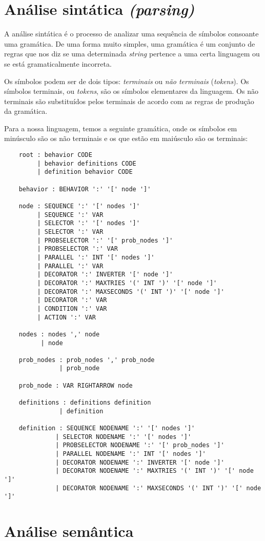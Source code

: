 \section{Análise sintática \textit{(parsing)}}
A análise sintática é o processo de analizar uma sequência de símbolos consoante uma gramática.
De uma forma muito simples, uma gramática é um conjunto de regras que nos diz se uma determinada \textit{string} pertence a uma certa linguagem ou se está gramaticalmente incorreta.

Os símbolos podem ser de dois tipos: \textit{terminais} ou \textit{não terminais} (\textit{tokens}).
Os símbolos terminais, ou \textit{tokens}, são os símbolos elementares da linguagem.
Os não terminais são substituídos pelos terminais de acordo com as regras de produção da gramática.

Para a nossa linguagem, temos a seguinte gramática, onde os símbolos em minúsculo são os não terminais e os que estão em maiúsculo são os terminais:

\begin{lstlisting}
    root : behavior CODE
         | behavior definitions CODE
         | definition behavior CODE

    behavior : BEHAVIOR ':' '[' node ']'

    node : SEQUENCE ':' '[' nodes ']'
         | SEQUENCE ':' VAR
         | SELECTOR ':' '[' nodes ']'
         | SELECTOR ':' VAR
         | PROBSELECTOR ':' '[' prob_nodes ']'
         | PROBSELECTOR ':' VAR
         | PARALLEL ':' INT '[' nodes ']'
         | PARALLEL ':' VAR
         | DECORATOR ':' INVERTER '[' node ']'
         | DECORATOR ':' MAXTRIES '(' INT ')' '[' node ']'
         | DECORATOR ':' MAXSECONDS '(' INT ')' '[' node ']'
         | DECORATOR ':' VAR
         | CONDITION ':' VAR
         | ACTION ':' VAR
    
    nodes : nodes ',' node
          | node
    
    prob_nodes : prob_nodes ',' prob_node
               | prob_node
    
    prob_node : VAR RIGHTARROW node

    definitions : definitions definition
               | definition

    definition : SEQUENCE NODENAME ':' '[' nodes ']'
              | SELECTOR NODENAME ':' '[' nodes ']'
              | PROBSELECTOR NODENAME ':' '[' prob_nodes ']'
              | PARALLEL NODENAME ':' INT '[' nodes ']'
              | DECORATOR NODENAME ':' INVERTER '[' node ']'
              | DECORATOR NODENAME ':' MAXTRIES '(' INT ')' '[' node ']'
              | DECORATOR NODENAME ':' MAXSECONDS '(' INT ')' '[' node ']'
\end{lstlisting}


\section{Análise semântica}
